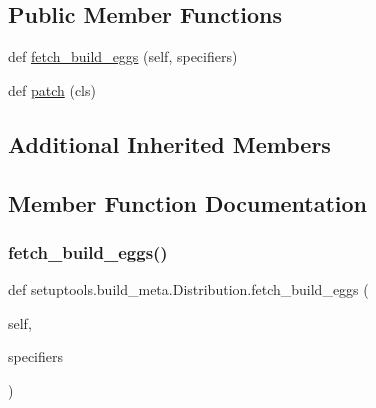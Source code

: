 \subsection*{Public Member Functions}
\begin{DoxyCompactItemize}
\item 
def \hyperlink{classsetuptools_1_1build__meta_1_1Distribution_a0750a768f6ccf6b86bf22d5d9c54c5c8}{fetch\+\_\+build\+\_\+eggs} (self, specifiers)
\item 
def \hyperlink{classsetuptools_1_1build__meta_1_1Distribution_aa2e373f39d117468118173896e4695b5}{patch} (cls)
\end{DoxyCompactItemize}
\subsection*{Additional Inherited Members}


\subsection{Member Function Documentation}
\mbox{\label{classsetuptools_1_1build__meta_1_1Distribution_a0750a768f6ccf6b86bf22d5d9c54c5c8}} 
\subsubsection{\texorpdfstring{fetch\+\_\+build\+\_\+eggs()}{fetch\_build\_eggs()}}
{\footnotesize\ttfamily def setuptools.\+build\+\_\+meta.\+Distribution.\+fetch\+\_\+build\+\_\+eggs (\begin{DoxyParamCaption}\item[{}]{self,  }\item[{}]{specifiers }\end{DoxyParamCaption})}

\mbox{\label{classsetuptools_1_1build__meta_1_1Distribution_aa2e373f39d117468118173896e4695b5}} 
